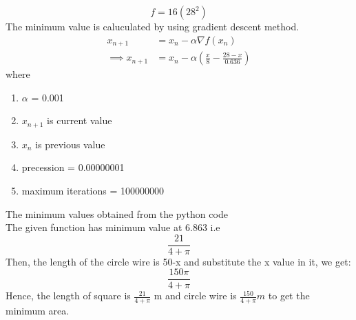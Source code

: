 \documentclass[journal,12pt,twocolumn]{IEEEtran}
\providecommand{\brak}[1]{\ensuremath{\left(#1\right)}}
\begin{document}
\begin{equation}
f = 16(28^2)
\end{equation}
The minimum value is caluculated by using gradient descent method.
\begin{align}
        x_{n+1} &= x_n - \alpha \nabla f(x_n) \\
        \implies x_{n+1} &= x_n - \alpha\brak{\frac{x}{8}-\frac{28-x}{0.636}}
\end{align}
where \\
\begin{enumerate}
\item $\alpha$ = 0.001
\item $x_{n+1}$ is current value
\item $x_{n}$ is previous value
\item precession = 0.00000001
\item maximum iterations = 100000000
\end{enumerate}
The minimum values obtained from the python code \vspace{5mm}\\
The given function has minimum value at 6.863 i.e
\begin{equation}
\frac{21}{4+\pi}
\end{equation}
Then, the length of the circle wire is 50-x and substitute the x value in it, we get:
\begin{equation}
\frac{150\pi}{4+\pi}
\end{equation}
Hence, the length of square is $\frac{21}{4+\pi}$ m and circle wire is $\frac{150}{4+\pi}m$ to get the minimum area.
\end{document}
